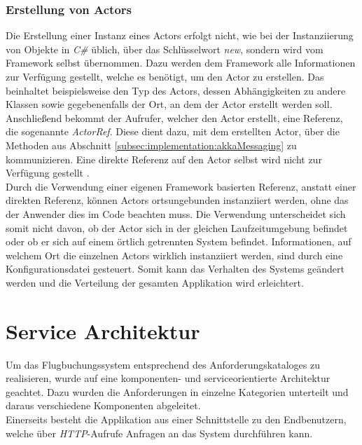 \subsubsection{Erstellung von Actors}
\label{subsec:implementation:actorCreation}
Die Erstellung einer Instanz eines Actors erfolgt nicht, wie bei der Instanziierung von Objekte in \textit{C\#} üblich, über das Schlüsselwort \textit{new}, sondern wird vom Framework selbst übernommen. Dazu werden dem Framework alle Informationen zur Verfügung gestellt, welche es benötigt, um den Actor zu erstellen. Das beinhaltet beispielsweise den Typ des Actors, dessen Abhängigkeiten zu andere Klassen sowie gegebenenfalls der Ort, an dem der Actor erstellt werden soll. Anschließend bekommt der Aufrufer, welcher den Actor erstellt, eine Referenz, die sogenannte \textit{ActorRef}. Diese dient dazu, mit dem erstellten Actor, über die Methoden aus Abschnitt \ref{subsec:implementation:akkaMessaging} zu kommunizieren. Eine direkte Referenz auf den Actor selbst wird nicht zur Verfügung gestellt \citep{Akka.netCommunityAkka.NETDocumentation}. \\
Durch die Verwendung einer eigenen Framework basierten Referenz, anstatt einer direkten Referenz, können Actors ortsungebunden instanziiert werden, ohne das der Anwender dies im Code beachten muss. Die Verwendung unterscheidet sich somit nicht davon, ob der Actor sich in der gleichen Laufzeitumgebung befindet oder ob er sich auf einem örtlich getrennten System befindet. Informationen, auf welchem Ort die einzelnen Actors wirklich instanziiert werden, sind durch eine Konfigurationsdatei gesteuert. Somit kann das Verhalten des Systems geändert werden und die Verteilung der gesamten Applikation wird  erleichtert.

\section{Service Architektur}
\label{sec:implementation:serviceAndComponentOrientation}
Um das Flugbuchungssystem entsprechend des Anforderungskataloges zu realisieren, wurde auf eine komponenten- und serviceorientierte Architektur geachtet. Dazu wurden die Anforderungen in einzelne Kategorien unterteilt und daraus verschiedene Komponenten abgeleitet. \\
Einerseits besteht die Applikation aus einer Schnittstelle zu den Endbenutzern, welche über \textit{HTTP}-Aufrufe Anfragen an das System durchführen kann. 

